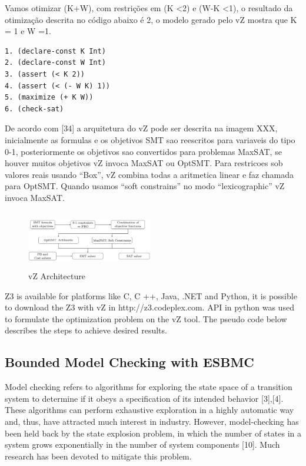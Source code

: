 Vamos otimizar (K+W), com restrições em (K \textless 2) e (W-K \textless 1), o resultado da otimização descrita no código abaixo é 2, o modelo gerado pelo vZ mostra que K = 1 e W =1.

\begin{lstlisting}
1. (declare-const K Int) 
2. (declare-const W Int)
3. (assert (< K 2)) 
4. (assert (< (- W K) 1))
5. (maximize (+ K W)) 
6. (check-sat)
\end{lstlisting}


De acordo com [34] a arquitetura do vZ pode ser descrita na imagem XXX, inicialmente as formulas e os objetivos SMT sao reescritos para variaveis do tipo 0-1, posteriormente os objetivos sao convertidos para problemas MaxSAT, se houver muitos objetivos vZ invoca MaxSAT ou OptSMT. Para restricoes sob valores reais usando “Box”, vZ combina todas a aritmetica linear e faz chamada para OptSMT. Quando usamos “soft constrains” no modo “lexicographic” vZ invoca MaxSAT.

\begin{figure}[ht]
	\centering
  \includegraphics[width=0.49\textwidth, height=95px]{Image/vzArch.png} 
	\caption{vZ Architecture}
	\label{fig2}
\end{figure}


Z3 is available for platforms like C, C ++, Java, .NET and Python, it is possible to download the Z3 with vZ in http://z3.codeplex.com. API in python was used to formulate the optimization problem on the vZ tool. The pseudo code below describes the steps to achieve desired results.

\subsection{Bounded Model Checking with ESBMC}

Model checking refers to algorithms for exploring the state space of a transition system to determine if it obeys a speciﬁcation of its intended behavior [3],[4]. These algorithms can perform exhaustive exploration in a highly automatic way and, thus, have attracted much interest in industry. However, model-checking has been held back by the state explosion problem, in which the number of states in a system grows exponentially in the number of system components [10]. Much research has been devoted to mitigate this problem.

